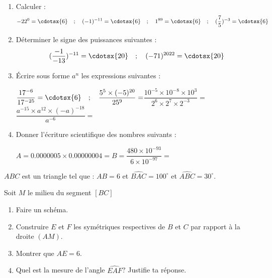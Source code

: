 \documentclass[a4paper,12pt]{article}
\begin{document}
\devoir[prv=true,ds=true,num=2 ,niv=2 , date=19/12/2022]

\begin{exo}[12]
\begin{enumerate}
\item Calculer : 
\[
 -22^{0}=\cdotsx{6} \quad; \quad (-1)^{-11}=\cdotsx{6} \quad; \quad 1^{89}=\cdotsx{6} \quad; \quad (\dfrac{7}{5})^{-3}=\cdotsx{6}
\]
\item Déterminer le signe des puissances suivantes :
\[ (\dfrac{-1}{-13})^{-11}=\cdotsx{20} \quad; \quad 
	(-71)^{2022}=\cdotsx{20}
\] 
\item Écrire sous forme $a^{n}$ les expressions suivantes :

$\dfrac{17^{-6}}{17^{-25}}=\cdotsx{6}\quad; \quad
	\dfrac{5^{5}\times (-5)^{20}}{25^{9}}=$\anserline[1]
$\dfrac{10^{-5}\times 10^{-8}\times 10^{3}}{2^{6}\times 2^{7}\times 2^{-3}}=$\anserline[1]
$\dfrac{a^{-15}\times a^{12}\times (-a)^{-18}}{a^{-6}}=$\anserline[1]

\item Donner l'écriture scientifique des nombres suivants :

$A=0.0000005\times 0.00000004=$\anserline[1]	
$B=\dfrac{480\times 10^{-93}}{6\times 10^{-97}}=$\anserline[1]
\end{enumerate}
\end{exo}

\begin{exo}[8]
$ABC$ est un triangle tel que : $AB=6$ et $\widehat{BAC}=100^{\circ}$ et $\widehat{ABC}=30^{\circ}$.

Soit $M$ le milieu du segment $[BC]$ 
\begin{enumerate}
\item Faire un schéma.
\item Construire $E$ et $F$ les symétriques respectives   de $B$ et $C$ par rapport à la droite $(AM)$.
\item Montrer que $AE=6$.
\item Quel est la mesure de l'angle $\widehat{EAF}$? Justifie ta réponse.
\end{enumerate}
\end{exo}
\end{document}
